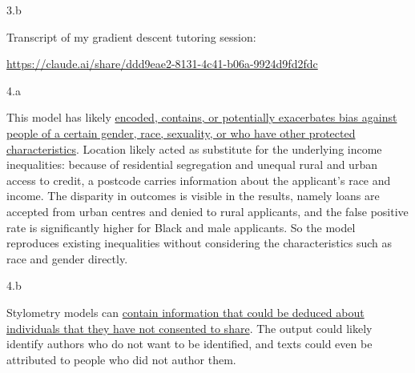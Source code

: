 \LARGE
3.b
\normalsize

\begin{answer}
  Transcript of my gradient descent tutoring session:

  \url{https://claude.ai/share/ddd9eae2-8131-4c41-b06a-9924d9fd2fdc}
\end{answer}
\clearpage

\LARGE
4.a
\normalsize

\begin{answer}
  This model has likely \ul{encoded, contains, or potentially exacerbates bias against people of a
  certain gender, race, sexuality, or who have other protected characteristics}. Location likely 
  acted as substitute for the underlying income inequalities: because
  of residential segregation and unequal rural and urban access to credit, a postcode carries
  information about the applicant's race and income. The disparity in outcomes is visible in the
  results, namely loans are accepted from urban centres and denied to rural applicants, and the false
  positive rate is significantly higher for Black and male applicants. So the model reproduces
  existing inequalities without considering the characteristics such as race and gender directly.
\end{answer}

\LARGE
4.b
\normalsize

\begin{answer}
  Stylometry models can \ul{contain information that could be deduced about individuals that they
  have not consented to share}. The output could likely identify authors who do not want to be
  identified, and texts could even be attributed to people who did not author them.
\end{answer}

